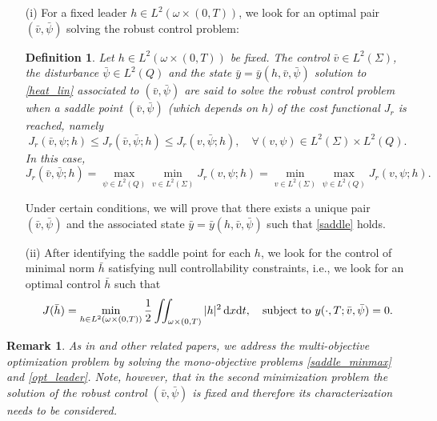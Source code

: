 \documentclass[preprint,10pt]{article}
\newtheorem{definition}[theorem]{Definition}
\newtheorem{remark}[theorem]{Remark}
\numberwithin{equation}{section}
\numberwithin{theorem}{section}
\def\dx{\,\textnormal{d}x}
\def\dt{\textnormal{d}t}
\def\dx{\,\textnormal{d}x}
\def\dt{\textnormal{d}t}
\begin{document}
{\begin{enumerate}
\item[(i)] For a fixed leader $h\in L^2(\omega\times(0,T))$, we look for an optimal pair $(\bar v,\bar \psi)$ solving the robust control problem:
%
\begin{definition}\label{defi_rob}
Let $h\in L^2(\omega\times(0,T))$ be fixed. The control $\bar v\in L^2(\Sigma)$, the disturbance $\bar \psi\in L^2(Q)$ and the state $\bar y=\bar y(h,\bar v,\bar \psi)$ solution to \eqref{heat_lin} associated to $(\bar v,\bar \psi)$ are said to solve the robust control problem when a saddle point $(\bar v,\bar \psi)$ (which depends on $h$) of the cost functional $J_r$ is reached, namely
%
\begin{equation}\label{saddle}
J_r(\bar v,\psi;h)\leq J_r(\bar v,\bar \psi;h)\leq J_r(v,\bar \psi;h), \quad \forall (v,\psi)\in L^2(\Sigma)\times L^2(Q).
\end{equation}
%
In this case,
%
\begin{equation}\label{saddle_minmax}
J_r(\bar v,\bar \psi;h)=\max_{\psi\in L^2(Q)}\min_{v\in L^2(\Sigma)}J_r(v,\psi;h)=\min_{v\in L^2(\Sigma)}\max_{\psi\in L^2(Q)}J_r(v,\psi;h).
\end{equation}
%
\end{definition} 
%
Under certain conditions, we will prove that there exists a unique pair $(\bar v,\bar \psi)$ and the associated state $\bar y=\bar y(h,\bar v,\bar\psi)$ such that \eqref{saddle} holds.
%
\item[(ii)] After identifying the saddle point for each $h$, we look for the control of minimal norm $\bar h$ satisfying null controllability constraints, i.e., we look for an optimal control $\bar h$  such that
%
\begin{equation}\label{opt_leader}
J(\bar h)=\min_{h\in L^2(\omega\times(0,T))}\frac{1}{2}\iint_{\omega\times(0,T)}|h|^2\dx\dt, \quad \text{subject to } y(\cdot,T;\bar v,\bar \psi)=0.
\end{equation}
\end{enumerate}

\begin{remark}
As in \cite{LionsSta} and other related papers, we address the multi-objective optimization problem by solving the mono-objective problems \eqref{saddle_minmax} and \eqref{opt_leader}. Note, however, that in the second minimization problem the solution of the robust control $(\bar v, \bar \psi)$ is fixed and therefore its characterization needs to be considered.
\end{remark}

}
\end{document}
